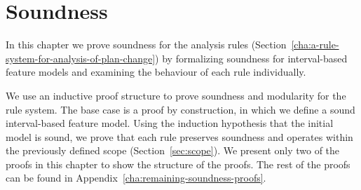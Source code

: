 \chapter{Soundness}
\label{cha:soundness}

In this chapter we prove soundness for the analysis rules (Section~\vref{cha:a-rule-system-for-analysis-of-plan-change}) by formalizing soundness for interval-based feature models and examining the behaviour of each rule individually.

We use an inductive proof structure to prove soundness and modularity for the rule system. The base case is a proof by construction, in which we define a sound interval-based feature model. Using the induction hypothesis that the initial model is sound, we prove that each rule preserves soundness and operates within the previously defined scope (Section~\vref{sec:scope}). We present only two of the proofs in this chapter to show the structure of the proofs. The rest of the proofs can be found in Appendix~\vref{cha:remaining-soundness-proofs}.








